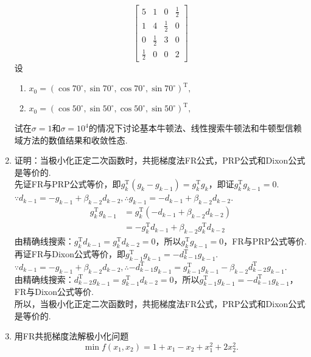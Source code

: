 \begin{enumerate}
\[\begin{bmatrix}
        5 & 1 & 0 & \displaystyle \frac{1}{2}\\
        1 & 4 & \displaystyle \frac{1}{2} & 0\\
        0 & \displaystyle \frac{1}{2} & 3 & 0\\
        \displaystyle \frac{1}{2} & 0 & 0 & 2
    \end{bmatrix}\]
    设\begin{enumerate}[label=(\arabic*)]
        \item $x_0=(\cos 70^\circ,\sin 70^\circ,\cos 70^\circ,\sin 70^\circ)^\mathrm{T},$
        \item $x_0=(\cos 50^\circ,\sin 50^\circ,\cos 50^\circ,\sin 50^\circ)^\mathrm{T},$
    \end{enumerate}
    试在$\sigma=1$和$\sigma = 10^4$的情况下讨论基本牛顿法、线性搜索牛顿法和牛顿型信赖域方法的数值结果和收敛性态.\\
    \omitted
    \item 证明：当极小化正定二次函数时，共扼梯度法FR公式，PRP公式和Dixon公式是等价的.\\
    \pro 先证FR与PRP公式等价，即$g_k^\mathrm{T}(g_k-g_{k-1})=g_k^\mathrm{T}g_k$，即证$g_k^\mathrm{T}g_{k-1}=0$.\\
    $\because d_{k-1}=-g_{k-1}+\beta_{k-2}d_{k-2}, \therefore g_{k-1} = -d_{k-1}+\beta_{k-2}d_{k-2}$.\\
    \begin{align*}
        g_k^{\mathrm{T}}g_{k-1} & = g_k^{\mathrm{T}}(-d_{k-1}+\beta_{k-2}d_{k-2})\\
        & = -g_k^{\mathrm{T}}d_{k-1}+\beta_{k-2}g_k^{\mathrm{T}}d_{k-2}
    \end{align*}
    由精确线搜索：$g_k^{\mathrm{T}}d_{k-1} = g_k^{\mathrm{T}}d_{k-2} = 0$，所以$g_k^\mathrm{T}g_{k-1}=0$，FR与PRP公式等价.\\
    再证FR与Dixon公式等价，即$g_{k-1}^\mathrm{T}g_{k-1}=-d_{k-1}^\mathrm{T}g_{k-1}$.\\
    $\because d_{k-1}=-g_{k-1}+\beta_{k-2}d_{k-2}, \therefore -d_{k-1}^\mathrm{T}g_{k-1} = g_{k-1}^\mathrm{T}g_{k-1}-\beta_{k-2}d_{k-2}^\mathrm{T}g_{k-1}$.\\
    由精确线搜索：$d_{k-2}^{\mathrm{T}}g_{k-1} = g_{k-1}^{\mathrm{T}}d_{k-2} = 0$，所以$g_{k-1}^\mathrm{T}g_{k-1}=-d_{k-1}^\mathrm{T}g_{k-1}$，FR与Dixon公式等价.\\
    所以，当极小化正定二次函数时，共扼梯度法FR公式，PRP公式和Dixon公式是等价的.
    \item 用FR共扼梯度法解极小化问题\[\min f(x_1,x_2)=1+x_1-x_2+x_1^2+2x_2^2.\]

\end{enumerate}
